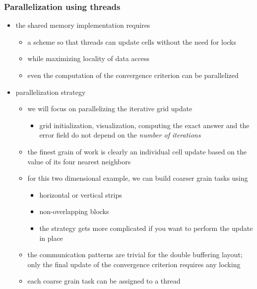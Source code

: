 \begin{frame}[fragile]
%
  \frametitle{Parallelization using threads}
%
  \begin{itemize}
%
  \item the shared memory implementation requires
    \begin{itemize}
    \item a scheme so that threads can update cells without the need for locks
    \item while maximizing locality of data access
    \item even the computation of the convergence criterion can be parallelized
    \end{itemize}
%
  \item parallelization strategy
    \begin{itemize}
    \item we will focus on parallelizing the iterative grid update
      \begin{itemize}
      \item grid initialization, visualization, computing the exact answer and the error field
        do not depend on the {\em number of iterations}
      \end{itemize}
    \item the finest grain of work is clearly an individual cell update based on the value of
      its four nearest neighbors
    \item for this two dimensional example, we can build coarser grain tasks using
      \begin{itemize}
      \item horizontal or vertical strips
      \item non-overlapping blocks
      \item the strategy gets more complicated if you want to perform the update in place
      \end{itemize}
    \item the communication patterns are trivial for the double buffering layout; only the
      final update of the convergence criterion requires any locking
    \item each coarse grain task can be assigned to a thread
    \end{itemize}
%
  \end{itemize}
% 
\end{frame}

